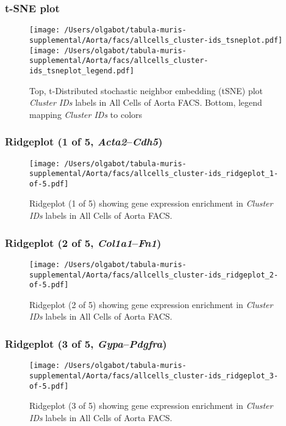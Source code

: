 \clearpage
\subsubsection{t-SNE plot}
\begin{figure}[h]
\centering
\texttt{[image: /Users/olgabot/tabula-muris-supplemental/Aorta/facs/allcells\_cluster-ids\_tsneplot.pdf]}
\texttt{[image: /Users/olgabot/tabula-muris-supplemental/Aorta/facs/allcells\_cluster-ids\_tsneplot\_legend.pdf]}
\caption{Top, t-Distributed stochastic neighbor embedding (tSNE) plot  \emph{Cluster IDs} labels in All Cells of Aorta FACS. Bottom, legend mapping \emph{Cluster IDs} to colors}
\end{figure}


\clearpage

\subsubsection{Ridgeplot (1 of 5, \emph{Acta2}--\emph{Cdh5})}
\begin{figure}[h]
\centering
\texttt{[image: /Users/olgabot/tabula-muris-supplemental/Aorta/facs/allcells\_cluster-ids\_ridgeplot\_1-of-5.pdf]}

\caption{ Ridgeplot (1 of 5)  showing gene expression enrichment in \emph{Cluster IDs} labels in All Cells of Aorta FACS. }
\end{figure}


\clearpage

\subsubsection{Ridgeplot (2 of 5, \emph{Col1a1}--\emph{Fn1})}
\begin{figure}[h]
\centering
\texttt{[image: /Users/olgabot/tabula-muris-supplemental/Aorta/facs/allcells\_cluster-ids\_ridgeplot\_2-of-5.pdf]}

\caption{ Ridgeplot (2 of 5)  showing gene expression enrichment in \emph{Cluster IDs} labels in All Cells of Aorta FACS. }
\end{figure}


\clearpage

\subsubsection{Ridgeplot (3 of 5, \emph{Gypa}--\emph{Pdgfra})}
\begin{figure}[h]
\centering
\texttt{[image: /Users/olgabot/tabula-muris-supplemental/Aorta/facs/allcells\_cluster-ids\_ridgeplot\_3-of-5.pdf]}

\caption{ Ridgeplot (3 of 5)  showing gene expression enrichment in \emph{Cluster IDs} labels in All Cells of Aorta FACS. }
\end{figure}


